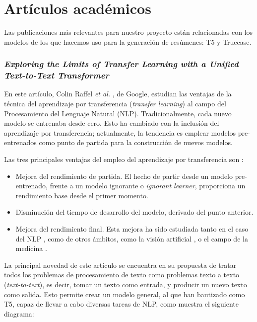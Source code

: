 
\section{Artículos académicos}

Las publicaciones más relevantes para nuestro proyecto están relacionadas con los modelos de los que hacemos uso para la generación de resúmenes: T5 y Truecase.

\subsubsection{\emph{Exploring the Limits of Transfer Learning with a Unified Text-to-Text Transformer}}

En este artículo, Colin Raffel \emph{et al.} \cite{raffel19}, de Google, estudian las ventajas de la técnica del aprendizaje por transferencia (\emph{transfer learning}) al campo del Procesamiento del Lenguaje Natural (NLP). Tradicionalmente, cada nuevo modelo se entrenaba desde cero. Esto ha cambiado con la inclusión del aprendizaje por transferencia; actualmente, la tendencia es emplear modelos pre-entrenados como punto de partida para la construcción de nuevos modelos.

Las tres principales ventajas del empleo del aprendizaje por transferencia son \cite{sarkar18}:

\vspace*{-\baselineskip}
\begin{itemize}
	\item [\textbullet] Mejora del rendimiento de partida. El hecho de partir desde un modelo pre-entrenado, frente a un modelo ignorante o \emph{ignorant learner}, proporciona un rendimiento base desde el primer momento.

	\item [\textbullet] Disminución del tiempo de desarrollo del modelo, derivado del punto anterior.
	
	\item [\textbullet] Mejora del rendimiento final. Esta mejora ha sido estudiada tanto en el caso del NLP \cite{kumar21}, como de otros ámbitos, como la visión artificial \cite{ali21}, o el campo de la medicina \cite{liu21}.
\end{itemize}

La principal novedad de este artículo se encuentra en su propuesta de tratar todos los problemas de procesamiento de texto como problemas texto a texto (\emph{text-to-text}), es decir, tomar un texto como entrada, y producir un nuevo texto como salida. Esto permite crear un modelo general, al que han bautizado como T5, capaz de llevar a cabo diversas tareas de NLP, como muestra el siguiente diagrama:

